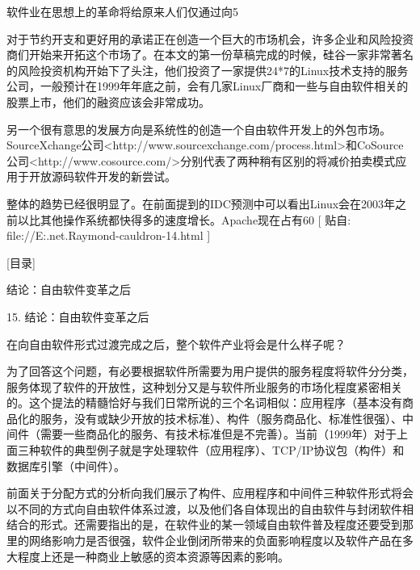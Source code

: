 \documentclass[a4paper,12pt,UTF8,twoside]{ctexbook}
\begin{document}
软件业在思想上的革命将给原来人们仅通过向5%


对于节约开支和更好用的承诺正在创造一个巨大的市场机会，许多企业和风险投资商们开始来开拓这个市场了。在本文的第一份草稿完成的时候，硅谷一家非常著名的风险投资机构开始下了头注，他们投资了一家提供24*7的Linux技术支持的服务公司，一般预计在1999年年底之前，会有几家Linux厂商和一些与自由软件相关的股票上市，他们的融资应该会非常成功。


另一个很有意思的发展方向是系统性的创造一个自由软件开发上的外包市场。SourceXchange公司<http://www.sourcexchange.com/process.html>和CoSource公司<http://www.cosource.com/>分别代表了两种稍有区别的将减价拍卖模式应用于开放源码软件开发的新尝试。


整体的趋势已经很明显了。在前面提到的IDC预测中可以看出Linux会在2003年之前以比其他操作系统都快得多的速度增长。Apache现在占有60%
[ 贴自: file://E:\joyfire\joyfire.net\bible\Eric.Raymond\magic-cauldron-14.html ]

[目录]

结论：自由软件变革之后

15. 结论：自由软件变革之后

在向自由软件形式过渡完成之后，整个软件产业将会是什么样子呢？


为了回答这个问题，有必要根据软件所需要为用户提供的服务程度将软件分分类，服务体现了软件的开放性，这种划分又是与软件所业服务的市场化程度紧密相关的。这个提法的精髓恰好与我们日常所说的三个名词相似：应用程序（基本没有商品化的服务，没有或缺少开放的技术标准）、构件（服务商品化、标准性很强）、中间件（需要一些商品化的服务、有技术标准但是不完善）。当前（1999年）对于上面三种软件的典型例子就是字处理软件（应用程序）、TCP/IP协议包（构件）和数据库引擎（中间件）。


前面关于分配方式的分析向我们展示了构件、应用程序和中间件三种软件形式将会以不同的方式向自由软件体系过渡，以及他们各自体现出的自由软件与封闭软件相结合的形式。还需要指出的是，在软件业的某一领域自由软件普及程度还要受到那里的网络影响力是否很强，软件企业倒闭所带来的负面影响程度以及软件产品在多大程度上还是一种商业上敏感的资本资源等因素的影响。
\end{document}

